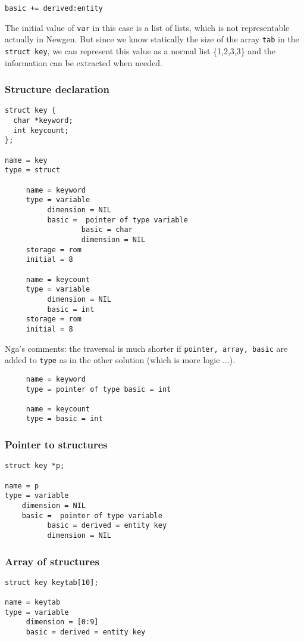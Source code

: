\documentclass[a4paper]{article}
\begin{document}
\verb/basic += derived:entity/

The initial value of \verb/var/ in this case is a list of lists, which is
not representable actually in Newgen. But since we know statically the
size of the array \verb/tab/ in the \verb/struct key/, we can represent
this value as a normal list \{1,2,3,3\} and the information can be extracted
when needed. 
\subsubsection{Structure declaration}
\begin{verbatim}
struct key {
  char *keyword;
  int keycount;
};

name = key
type = struct 

     name = keyword
     type = variable
          dimension = NIL
          basic =  pointer of type variable
                  basic = char
                  dimension = NIL
     storage = rom
     initial = 8

     name = keycount
     type = variable
          dimension = NIL
          basic = int
     storage = rom
     initial = 8
\end{verbatim}
Nga's comments: the traversal is much shorter if 
\verb/pointer, array, basic/ are added to \verb/type/ as in the other
solution (which is more logic ...).
\begin{verbatim}
     name = keyword
     type = pointer of type basic = int

     name = keycount
     type = basic = int
\end{verbatim}
\subsubsection{Pointer to structures}
\begin{verbatim}
struct key *p;

name = p
type = variable
    dimension = NIL
    basic =  pointer of type variable
          basic = derived = entity key
          dimension = NIL
\end{verbatim}
\subsubsection{Array of structures}
\begin{verbatim}
struct key keytab[10];

name = keytab
type = variable
     dimension = [0:9]
     basic = derived = entity key
\end{verbatim}
\end{document}
